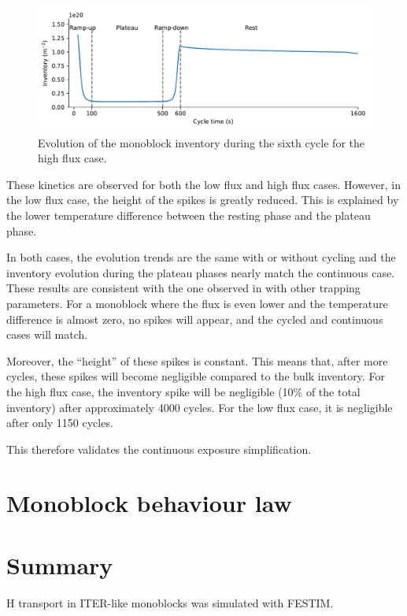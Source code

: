 \begin{figure}
    \centering
    \includegraphics[width=\linewidth]{Figures/Chapter3/monoblocks/inventory_one_cycle.pdf}
    \caption{Evolution of the monoblock inventory during the sixth cycle for the high flux case.}
\end{figure}

These kinetics are observed for both the low flux and high flux cases.
However, in the low flux case, the height of the spikes is greatly reduced.
This is explained by the lower temperature difference between the resting phase and the plateau phase.

In both cases, the evolution trends are the same with or without cycling and the inventory evolution during the plateau phases nearly match the continuous case.
These results are consistent with the one observed in  with other trapping parameters.
For a monoblock where the flux is even lower and the temperature difference is almost zero, no spikes will appear, and the cycled and continuous cases will match.

Moreover, the ``height'' of these spikes is constant.
This means that, after more cycles, these spikes will become negligible compared to the bulk inventory.
For the high flux case, the inventory spike will be negligible (10\% of the total inventory) after approximately 4000 cycles.
For the low flux case, it is negligible after only 1150 cycles.

This therefore validates the continuous exposure simplification.


\section{Monoblock behaviour law}



\section{Summary}
H transport in ITER-like monoblocks was simulated with FESTIM.

